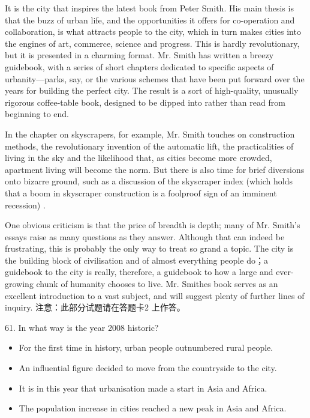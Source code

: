 \documentclass[UTF8,11pt]{ctexart}
\begin{document}
It is the city that inspires the latest book from Peter Smith. His main thesis is that the buzz of urban life, and the opportunities it offers for co-operation and collaboration, is what attracts people to the city, which in turn makes cities into the engines of art, commerce, science and progress. This is hardly revolutionary, but it is presented in a charming format. Mr. Smith has written a breezy guidebook, with a series of short chapters dedicated to specific aspects of urbanity—parks, say, or the various schemes that have been put forward over the years for building the perfect city. The result is a sort of high-quality, unusually rigorous coffee-table book, designed to be dipped into rather than read from beginning to end.


In the chapter on skyscrapers, for example, Mr. Smith touches on construction methods, the revolutionary invention of the automatic lift, the practicalities of living in the sky and the likelihood that, as cities become more crowded, apartment living will become the norm. But there is also time for brief diversions onto bizarre ground, such as a discussion of the skyscraper index (which holds that a boom in skyscraper construction is a foolproof sign of an imminent recession) .


One obvious criticism is that the price of breadth is depth; many of Mr. Smith’s essays raise as many questions as they answer. Although that can indeed be frustrating, this is probably the only way to treat so grand a topic. The city is the building block of civilisation and of almost everything people do；a guidebook to the city is really, therefore, a guidebook to how a large and ever-growing chunk of humanity chooses to live. Mr. Smithes book serves as an excellent introduction to a vast subject, and will suggest plenty of further lines of inquiry. 注意：此部分试题请在答题卡2 上作答。


61. In what way is the year 2008 historic?


\begin{itemize}[leftmargin=2em,itemsep=.2em,topsep=.4em]\item[A.] For the first time in history, urban people outnumbered rural people.
\item[B.] An influential figure decided to move from the countryside to the city.
\item[C.] It is in this year that urbanisation made a start in Asia and Africa.
\item[D.] The population increase in cities reached a new peak in Asia and Africa.
\end{itemize}
\end{document}
